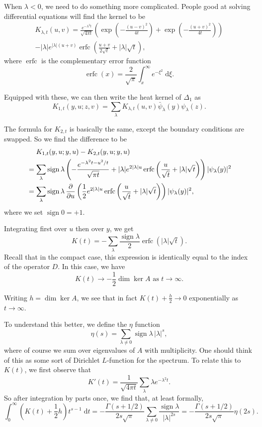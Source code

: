 \documentclass{shortart}
\theoremstyle{definition}
\renewcommand\d{\mathrm{d}}
\DeclareMathOperator\sign{sign}
\DeclareMathOperator\erfc{erfc}
\begin{document}
When $\lambda < 0$, we need to do something more complicated. People good at solving differential equations will find the kernel to be
\begin{multline*}
  K_{\lambda, t}(u, v) = \frac{e^{-\lambda^2 t}}{\sqrt{4\pi t}} \left(\exp \left(-\frac{(u - v)^2}{4t}\right) + \exp\left(-\frac{(u + v)^2}{4t}\right)\right) \\
  - |\lambda| e^{|\lambda|(u + v)} \erfc \left(\frac{u + v}{2\sqrt{t}} + |\lambda| \sqrt{t}\right),
\end{multline*}
where $\erfc$ is the complementary error function
\[
  \erfc (x) = \frac{2}{\sqrt{\pi}} \int_x^\infty e^{- \xi^2}\;\d \xi.
\]

Equipped with these, we can then write the heat kernel of $\Delta_1$ as
\[
  K_{1, t}(y, u; z, v) = \sum_\lambda K_{\lambda, t}(u, v) \bar{\psi}_\lambda(y) \psi_\lambda(z).
\]

The formula for $K_{2, t}$ is basically the same, except the boundary conditions are swapped. So we find the difference to be
\[
  \begin{aligned}
    &\hphantom{{}={}}K_{1, t}(y, u; y, u) - K_{2, t}(y, u; y, u)\\
    &= \sum_\lambda \sign \lambda \left(-\frac{e^{-\lambda^2t - u^2/t}}{\sqrt{\pi t}} + |\lambda| e^{2|\lambda| u} \erfc \left(\frac{u}{\sqrt{t}} + |\lambda| \sqrt{t}\right)\right) |\psi_\lambda(y)|^2\\
    &= \sum_\lambda \sign \lambda\, \frac{\partial}{\partial u}\left(\frac{1}{2} e^{2|\lambda|u} \erfc \left(\frac{u}{\sqrt{t}} + |\lambda|\sqrt{t}\right)\right) |\psi_\lambda(y)|^2,
  \end{aligned}
\]
where we set $\sign 0 = +1$.

Integrating first over $u$ then over $y$, we get
\[
  K(t) = -\sum_\lambda \frac{\sign \lambda}{2} \erfc (|\lambda|\sqrt{t}).
\]
Recall that in the compact case, this expression is identically equal to the index of the operator $D$. In this case, we have
\[
  K(t) \to -\frac{1}{2} \dim \ker A \text{ as } t \to \infty.
\]

Writing $h = \dim \ker A$, we see that in fact $K(t) + \frac{h}{2} \to 0$ exponentially as $t \to \infty$.

To understand this better, we define the $\eta$ function
\[
  \eta(s) = \sum_{\lambda \not= 0} \sign \lambda \,|\lambda|^s,
\]
where of course we sum over eigenvalues of $A$ with multiplicity. One should think of this as some sort of Dirichlet $L$-function for the spectrum. To relate this to $K(t)$, we first observe that
\[
  K'(t) = \frac{1}{\sqrt{4\pi t}} \sum_\lambda \lambda e^{-\lambda^2 t}.
\]
So after integration by parts once, we find that, at least formally,
\[
  \int_0^\infty \left(K(t) + \frac{1}{2}h\right) t^{s - 1} \;\d t = - \frac{\Gamma(s + 1/2)}{2s \sqrt{\pi}} \sum_{\lambda \not= 0} \frac{\sign \lambda}{|\lambda|^{2s}} = - \frac{\Gamma(s + 1/2)}{2s\sqrt{\pi}} \eta(2s).
\]
\end{document}
